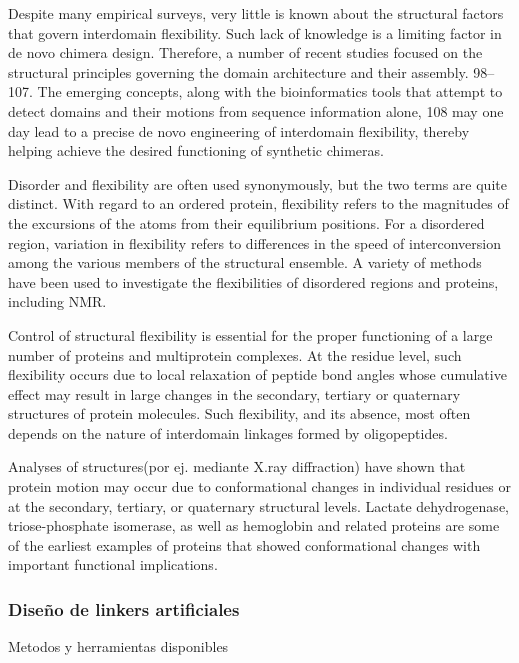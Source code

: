 Despite many empirical surveys, very little is known about the structural factors that govern interdomain flexibility. 
Such lack of knowledge is a limiting factor in de novo chimera design. Therefore, a number of recent studies focused on the structural principles governing the domain architecture and their assembly. 98–107. The emerging concepts, along
with the bioinformatics tools that attempt to detect domains and their motions from sequence information alone, 108 may one day lead to a precise de novo engineering of interdomain flexibility, thereby helping
achieve the desired functioning of synthetic chimeras.


Disorder and flexibility are often used synonymously, but the two terms are quite distinct\cite{radivojac2004protein}. 
With regard to an ordered protein, flexibility refers to the magnitudes of the excursions of the atoms from their equilibrium positions.
For a disordered region, variation in flexibility refers to differences in the speed of interconversion among the various members of the structural ensemble. 
A variety of methods have been used to investigate the flexibilities of disordered regions and proteins, including NMR.

Control of structural flexibility is essential for the proper functioning of a large number of proteins and multiprotein complexes. 
At the residue level, such flexibility occurs due to local relaxation of peptide bond angles whose cumulative effect may result in large changes in the secondary, tertiary or quaternary structures of protein molecules. 
Such flexibility, and its absence, most often depends on the nature of interdomain linkages formed by oligopeptides.

Analyses of structures(por ej. mediante X.ray diffraction) have shown that protein motion may occur due to conformational changes in individual residues or at the secondary, tertiary, or quaternary structural levels. Lactate dehydrogenase, triose-phosphate isomerase, as well as hemoglobin and related proteins are some of the earliest examples of proteins that showed conformational changes with important functional implications.





  
\subsubsection{Diseño de linkers artificiales}
Metodos y herramientas disponibles


